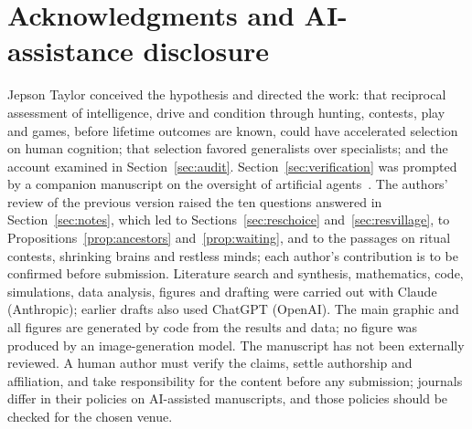 \section*{Acknowledgments and AI-assistance disclosure}

\noindent Jepson Taylor conceived the hypothesis and directed the work: that reciprocal assessment of intelligence, drive
and condition through hunting, contests, play and games, before lifetime outcomes are known, could have accelerated
selection on human cognition; that selection favored generalists over specialists; and the account examined in
Section~\ref{sec:audit}. Section~\ref{sec:verification} was prompted by a companion manuscript on the oversight of artificial
agents~\cite{taylor2026iina}. The authors' review of the previous version raised the ten questions answered in
Section~\ref{sec:notes}, which led to Sections~\ref{sec:reschoice} and~\ref{sec:resvillage}, to
Propositions~\ref{prop:ancestors} and~\ref{prop:waiting}, and to the passages on ritual contests, shrinking brains and
restless minds; each author's contribution is to be confirmed before submission. Literature search and synthesis, mathematics, code, simulations, data analysis, figures and drafting
were carried out with Claude (Anthropic); earlier drafts also used ChatGPT (OpenAI). The main graphic and all figures are
generated by code from the results and data; no figure was produced by an image-generation model. The manuscript has not
been externally reviewed. A human author must verify the claims, settle authorship and affiliation, and take responsibility
for the content before any submission; journals differ in their policies on AI-assisted manuscripts, and those policies
should be checked for the chosen venue.
